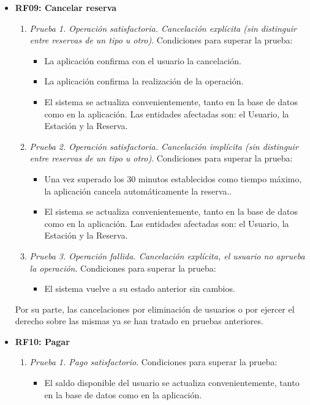 \begin{itemize}
	\item \textbf{RF09: Cancelar reserva}
	\begin{enumerate}
		\item \textit{Prueba 1. Operación satisfactoria. Cancelación explícita (sin distinguir entre reservas de un tipo u otro)}. Condiciones para superar la prueba:
		\begin{itemize}
			\item La aplicación confirma con el usuario la cancelación.
			\item La aplicación confirma la realización de la operación.
			\item El sistema se actualiza convenientemente, tanto en la base de datos como en la aplicación. Las entidades afectadas son: el Usuario, la Estación y la Reserva.
		\end{itemize}
		\item \textit{Prueba 2. Operación satisfactoria. Cancelación implícita (sin distinguir entre reservas de un tipo u otro)}. Condiciones para superar la prueba:
		\begin{itemize}
			\item Una vez superado los 30 minutos establecidos como tiempo máximo, la aplicación cancela automáticamente la reserva..
			\item El sistema se actualiza convenientemente, tanto en la base de datos como en la aplicación. Las entidades afectadas son: el Usuario, la Estación y la Reserva.
		\end{itemize}
		\item \textit{Prueba 3. Operación fallida. Cancelación explícita, el usuario no aprueba la operación}. Condiciones para superar la prueba:
		\begin{itemize}
			\item El sistema vuelve a su estado anterior sin cambios.
		\end{itemize}
	\end{enumerate}
	
	Por su parte, las cancelaciones por eliminación de usuarios o por ejercer el derecho sobre las mismas ya se han tratado en pruebas anteriores.
		
	\item \textbf{RF10: Pagar}
	\begin{enumerate}
		\item \textit{Prueba 1. Pago satisfactorio}. Condiciones para superar la prueba:
		\begin{itemize}
			\item El saldo disponible del usuario se actualiza convenientemente, tanto en la base de datos como en la aplicación.
		\end{itemize}	
	\end{enumerate}
	

\end{itemize}
